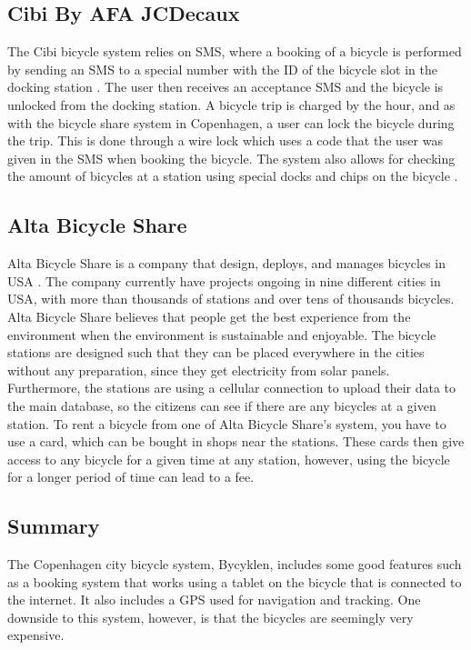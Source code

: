 \subsection{Cibi By AFA JCDecaux}
The Cibi bicycle system relies on SMS, where a booking of a bicycle is performed by sending an SMS to a special number with the ID of the bicycle slot in the docking station \citep{misc:cibi}. 
The user then receives an acceptance SMS and the bicycle is unlocked from the docking station. 
A bicycle trip is charged by the hour, and as with the bicycle share system in Copenhagen, a user can lock the bicycle during the trip. 
This is done through a wire lock which uses a code that the user was given in the SMS when booking the bicycle.
The system also allows for checking the amount of bicycles at a station using special docks and chips on the bicycle \citep{misc:omcibi}.

\subsection{Alta Bicycle Share}\label{subsec:alta}
Alta Bicycle Share is a company that design, deploys, and manages bicycles in USA \citep{misc:AltaBicycleShare}.
The company currently have projects ongoing in nine different cities in USA, with more than thousands of stations and over tens of thousands bicycles. 
Alta Bicycle Share believes that people get the best experience from the environment when the environment is sustainable and enjoyable.
The bicycle stations are designed such that they can be placed everywhere in the cities without any preparation, since they get electricity from solar panels.
Furthermore, the stations are using a cellular connection to upload their data to the main database, so the citizens can see if there are any bicycles at a given station.
To rent a bicycle from one of Alta Bicycle Share's system, you have to use a card, which can be bought in shops near the stations.
These cards then give access to any bicycle for a given time at any station, however, using the bicycle for a longer period of time can lead to a fee.

\subsection{Summary}
The Copenhagen city bicycle system, Bycyklen, includes some good features such as a booking system that works using a tablet on the bicycle that is connected to the internet.
It also includes a GPS used for navigation and tracking.
One downside to this system, however, is that the bicycles are seemingly very expensive.

